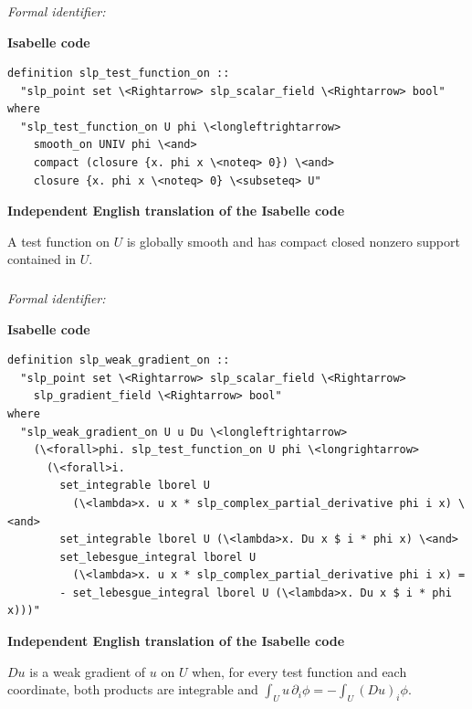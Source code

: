 \documentclass[10pt,oneside]{article}
\newcommand{\reviewlabel}[1]{\par\smallskip\noindent\textsf{\bfseries #1}\par\smallskip}
\begin{document}
\subsubsection{\texttt{}}
\noindent\textit{Formal identifier:} \texttt{}

\reviewlabel{Isabelle code}
\begin{lstlisting}
definition slp_test_function_on ::
  "slp_point set \<Rightarrow> slp_scalar_field \<Rightarrow> bool"
where
  "slp_test_function_on U phi \<longleftrightarrow>
    smooth_on UNIV phi \<and>
    compact (closure {x. phi x \<noteq> 0}) \<and>
    closure {x. phi x \<noteq> 0} \<subseteq> U"
\end{lstlisting}

\reviewlabel{Independent English translation of the Isabelle code}
A test function on $U$ is globally smooth and has compact closed nonzero support contained in $U$.

\subsubsection{\texttt{}}
\noindent\textit{Formal identifier:} \texttt{}

\reviewlabel{Isabelle code}
\begin{lstlisting}
definition slp_weak_gradient_on ::
  "slp_point set \<Rightarrow> slp_scalar_field \<Rightarrow>
    slp_gradient_field \<Rightarrow> bool"
where
  "slp_weak_gradient_on U u Du \<longleftrightarrow>
    (\<forall>phi. slp_test_function_on U phi \<longrightarrow>
      (\<forall>i.
        set_integrable lborel U
          (\<lambda>x. u x * slp_complex_partial_derivative phi i x) \<and>
        set_integrable lborel U (\<lambda>x. Du x $ i * phi x) \<and>
        set_lebesgue_integral lborel U
          (\<lambda>x. u x * slp_complex_partial_derivative phi i x) =
        - set_lebesgue_integral lborel U (\<lambda>x. Du x $ i * phi x)))"
\end{lstlisting}

\reviewlabel{Independent English translation of the Isabelle code}
$Du$ is a weak gradient of $u$ on $U$ when, for every test function and each coordinate, both products are integrable and $\int_U u\,\partial_i\phi=-\int_U(Du)_i\phi$.
\end{document}
